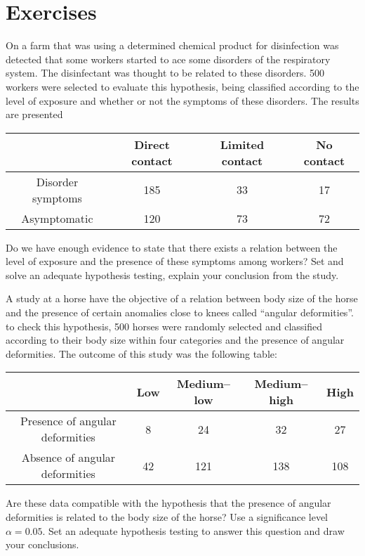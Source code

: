 \section{Exercises}
\label{ChiExercises}




\begin{problem}
  On a farm that was using a determined chemical product for
  disinfection was detected that some workers started to ace some
  disorders of the respiratory system. The disinfectant was thought to
  be related to  these disorders.  500 workers were selected to
  evaluate this hypothesis, being classified according to the level of
  exposure  and whether or not the symptoms of these disorders. The
  results are presented 
  \begin{center}
  \begin{tabular}{|c|*{3}{c}|}
    \hline               &  Direct contact  & Limited contact & No contact  \\
    \hline  Disorder symptoms &  185 & 33 & 17 \\
   Asymptomatic & 120 & 73 & 72 \\
\hline   
  \end{tabular}  
  \end{center}
  
Do we have enough evidence to state that there exists a relation
between the level of exposure and the presence of these symptoms among workers? Set and solve an adequate hypothesis testing, explain your conclusion from the study. 
\end{problem}


  \begin{problem}
   
A study at a horse  have the objective of a relation between body size of the horse  and the presence of  certain anomalies close to  knees called ``angular deformities''. to check this hypothesis, 500 horses were randomly selected and classified according to their body size within four categories and the presence of angular deformities. The outcome of this study was the following table: 

\begin{center}
\begin{tabular}{|c|*{4}{c}|}
\hline                                                     &  Low &
                                                    Medium--low & 
                                    Medium--high & 
High \\ 
 \hline  Presence of angular deformities & 8 & 24 & 32 & 27 \\
Absence of angular deformities & 42 & 121 & 138 & 108 \\ 
\hline 
\end{tabular}
  
\end{center}

Are these data compatible with the hypothesis that the presence of angular deformities is related to the body size of the horse? Use a significance level $\alpha=0.05$. Set an adequate hypothesis testing to answer this question and draw your conclusions.   
  \end{problem}


